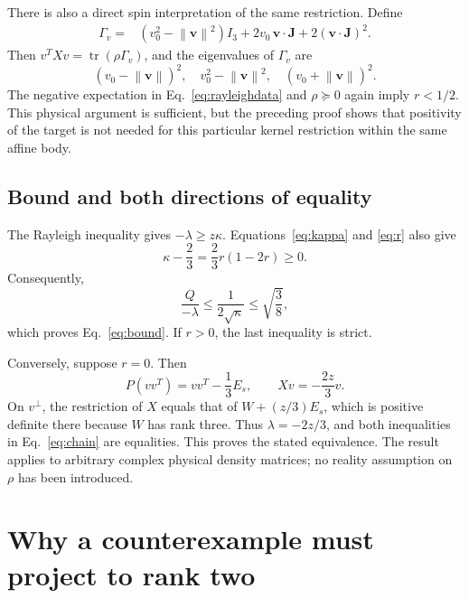 \documentclass[aps,pra,reprint,amsmath,amssymb,superscriptaddress,longbibliography]{revtex4-2}
\newcommand{\tr}{\operatorname{tr}}
\newcommand{\Id}{I}
\newcommand{\norm}[1]{\left\lVert #1\right\rVert}
\begin{document}
There is also a direct spin interpretation of the same restriction. Define
\begin{align}
 \Gamma_v={}&(v_0^2-\norm{\bm v}^2)\Id_3
       +2v_0\,\bm v\cdot\bm J
       +2(\bm v\cdot\bm J)^2.
 \label{eq:gamma}
\end{align}
Then \(v^TXv=\tr(\rho\Gamma_v)\), and the eigenvalues of \(\Gamma_v\) are
\begin{equation}
 (v_0-\norm{\bm v})^2,\quad
 v_0^2-\norm{\bm v}^2,\quad
 (v_0+\norm{\bm v})^2.
\end{equation}
The negative expectation in Eq.~\eqref{eq:rayleighdata} and \(\rho\succeq0\) again imply \(r<1/2\). This physical argument is sufficient, but the preceding proof shows that positivity of the target is not needed for this particular kernel restriction within the same affine body.

\subsection{Bound and both directions of equality}

The Rayleigh inequality gives \(-\lambda\geq z\kappa\). Equations~\eqref{eq:kappa} and \eqref{eq:r} also give
\begin{equation}
 \kappa-\frac23=\frac23r(1-2r)\geq0.
\end{equation}
Consequently,
\begin{equation}
 \frac{Q}{-\lambda}
 \leq\frac{1}{2\sqrt{\kappa}}
 \leq\sqrt{\frac38},
 \label{eq:chain}
\end{equation}
which proves Eq.~\eqref{eq:bound}. If \(r>0\), the last inequality is strict.

Conversely, suppose \(r=0\). Then
\begin{equation}
 P(vv^T)=vv^T-\frac13E_s,\qquad
 Xv=-\frac{2z}{3}v.
\end{equation}
On \(v^\perp\), the restriction of \(X\) equals that of \(W+(z/3)E_s\), which is positive definite there because \(W\) has rank three. Thus \(\lambda=-2z/3\), and both inequalities in Eq.~\eqref{eq:chain} are equalities. This proves the stated equivalence. The result applies to arbitrary complex physical density matrices; no reality assumption on \(\rho\) has been introduced.

\section{Why a counterexample must project to rank two}
\label{sec:ranktwo}
\end{document}
